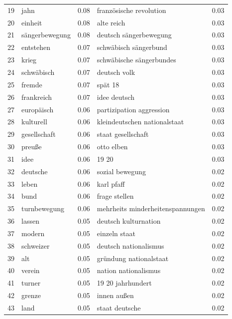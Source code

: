 \documentclass[11pt]{article}
\begin{document}
\begin{table}[H]
\begin{center}
\begin{small}
\begin{tabular*}{\textwidth}{|l|| @{\extracolsep{\fill}} l c || l c |}
19  &      jahn    &  0.08  &     französische revolution &  0.03  \\
20  &       einheit   &  0.08  &        alte reich  &  0.03  \\
21  &     sängerbewegung   &  0.08 &   deutsch sängerbewegung  &  0.03  \\
22  &     entstehen    &  0.07  &     schwäbisch sängerbund  &  0.03  \\
23  &    krieg   &  0.07  &   schwäbische sängerbundes  &  0.03  \\
24  &   schwäbisch   &  0.07  &     deutsch volk  &  0.03  \\
25  &       fremde   &  0.07  &      spät 18  &  0.03  \\
26  &     frankreich   &  0.07  &     idee deutsch  &  0.03  \\
27  &       europäisch   &  0.06  & partizipation aggression  &  0.03  \\
28  &       kulturell   &  0.06  &    kleindeutschen nationalstaat  &  0.03  \\
29  &       gesellschaft   &  0.06  &   staat gesellschaft  &  0.03  \\
30  &    preuße   &  0.06  &     otto elben  &  0.03  \\
31  &       idee   &  0.06  &     19 20  &  0.03  \\
32  &    deutsche   &  0.06  & sozial bewegung  &  0.02  \\
33  &          leben    &  0.06  &      karl pfaff  &  0.02  \\
34  &     bund    &  0.06  &      frage stellen  &  0.02  \\
35  &         turnbewegung  &  0.06  &    mehrheits minderheitenspannungen  &  0.02  \\
36  &     lassen   &  0.05  &   deutsch kulturnation  &  0.02  \\
37  &        modern   &  0.05  &     einzeln staat  &  0.02  \\
38  &       schweizer  &  0.05  &     deutsch nationalismus  &  0.02  \\
39  &   alt    &  0.05  &       gründung nationalstaat  &  0.02  \\
40  &     verein   &  0.05  &     nation nationalismus  &  0.02  \\
41  &      turner    &  0.05  &    19 20 jahrhundert  &  0.02  \\
42  &       grenze   &  0.05  &   innen außen  &  0.02  \\
43  &       land    &  0.05  &  staat deutsche  &  0.02  \\

\end{tabular*}
\end{small}
\end{center}
\end{table}
\end{document}
